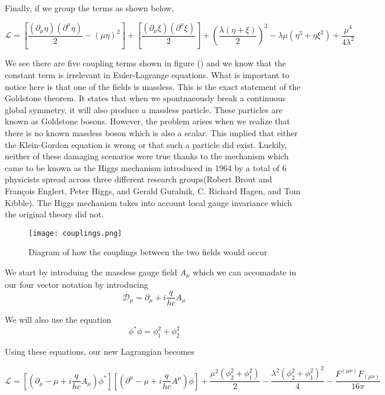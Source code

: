 \documentclass[12pt]{article}
\begin{document}
Finally, if we group the terms as shown below,

\begin{equation}
\mathcal{L}=[\frac{(\partial_\mu\eta)(\partial^\mu\eta)}{2}-(\mu\eta)^2]+[\frac{(\partial_\mu\xi)(\partial^\mu\xi)}{2}]+(\frac{\lambda(\eta+\xi)}{2})^2-\lambda\mu(\eta^3+\eta\xi^2)+\frac{\mu^4}{4\lambda^2}
\end{equation}

We see there are five coupling terms shown in figure () and we know that the constant term is irrelevant in Euler-Lagrange equations. What is important to notice here is that one of the fields is massless. This is the exact statement of the Goldstone theorem. It states that when we spontnaeously break a continuous global symmetry, it will also produce a massless particle. These particles are known as Goldstone bosons. However, the problem arises when we realize that there is no known massless boson which is also a scalar. This implied that either the Klein-Gordon equation is wrong or that such a particle did exist. Luckily, neither of these damaging scenarios were true thanks to the mechanism which came to be known as the Higgs mechanism introduced in 1964 by a total of 6 physicists spread across three different research groups(Robert Brout and François Englert, Peter Higgs, and Gerald Guralnik, C. Richard Hagen, and Tom Kibble). The Higgs mechanism takes into account local gauge invariance which the original theory did not. 
\begin{figure}[H]
	\begin{center}
		\texttt{[image: couplings.png]}
	\end{center}
	\caption{Diagram of how the couplings between the two fields would occur}
	\label{fig:figure3}
	\cite{ts}
\end{figure} 

We start by introduing the massless gauge field $A_\mu$ which we can accomadate in our four vector notation by introducing 
\begin{equation}
\mathcal{D}_\mu=\partial_\mu+i\frac{q}{hc}A_\mu
\end{equation}	

We will also use the equation 
\begin{equation}
\phi^\ast\phi=\phi^2_1+\phi^2_2
\end{equation}

Using these equations, our new Lagrangian becomes

\begin{equation}
\mathcal{L}=[(\partial_\mu-\mu+i\frac{q}{hc}A_\mu)\phi^\ast][(\partial^\mu-\mu+i\frac{q}{hc}A^\mu)\phi]+\frac{\mu^2(\phi_2^2+\phi_1^2)}{2}-\frac{\lambda^2(\phi_2^2+\phi_1^2)^2}{4}-\frac{F^(\mu\nu)F_(\mu\nu)}{16\pi}
\end{equation}
\end{document}
